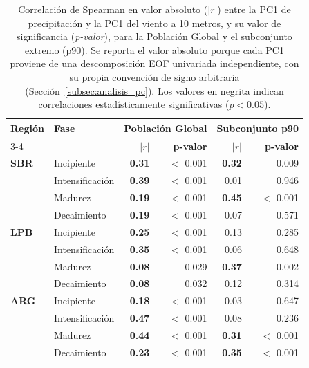 \begin{table}[htbp]
\centering
\caption[Coherencia entre los modos de precipitación y viento a 10m (Global y p90)]{Correlación de Spearman en valor absoluto ($|r|$) entre la PC1 de precipitación y la PC1 del viento a 10 metros, y su valor de significancia (\textit{p-valor}), para la Población Global y el subconjunto extremo (p90). Se reporta el valor absoluto porque cada PC1 proviene de una descomposición EOF univariada independiente, con su propia convención de signo arbitraria (Sección~\ref{subsec:analisis_pc}). Los valores en negrita indican correlaciones estadísticamente significativas ($p < 0.05$).}
\label{tab:meof_coherencia}
\begin{tabular*}{\textwidth}{@{\extracolsep{\fill}}llrrrr}
\hline
\textbf{Región} & \textbf{Fase} & \multicolumn{2}{c}{\textbf{Población Global}} & \multicolumn{2}{c}{\textbf{Subconjunto p90}} \\
\cline{3-4} \cline{5-6}
 & & \textbf{$|r|$} & \textbf{p-valor} & \textbf{$|r|$} & \textbf{p-valor} \\
\hline
\textbf{SBR} & Incipiente & \textbf{0.31} & $<$ 0.001 & \textbf{0.32} & 0.009 \\
 & Intensificación & \textbf{0.39} & $<$ 0.001 & 0.01 & 0.946 \\
 & Madurez & \textbf{0.19} & $<$ 0.001 & \textbf{0.45} & $<$ 0.001 \\
 & Decaimiento & \textbf{0.19} & $<$ 0.001 & 0.07 & 0.571 \\
\hline
\textbf{LPB} & Incipiente & \textbf{0.25} & $<$ 0.001 & 0.13 & 0.285 \\
 & Intensificación & \textbf{0.35} & $<$ 0.001 & 0.06 & 0.648 \\
 & Madurez & \textbf{0.08} & 0.029 & \textbf{0.37} & 0.002 \\
 & Decaimiento & \textbf{0.08} & 0.032 & 0.12 & 0.314 \\
\hline
\textbf{ARG} & Incipiente & \textbf{0.18} & $<$ 0.001 & 0.03 & 0.647 \\
 & Intensificación & \textbf{0.47} & $<$ 0.001 & 0.08 & 0.236 \\
 & Madurez & \textbf{0.44} & $<$ 0.001 & \textbf{0.31} & $<$ 0.001 \\
 & Decaimiento & \textbf{0.23} & $<$ 0.001 & \textbf{0.35} & $<$ 0.001 \\
\hline
\end{tabular*}
\end{table}
